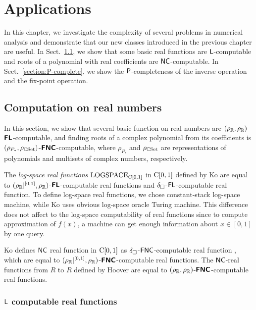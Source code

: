 \documentclass[envcountsame,orivec,oribibl]{llncs}
\begin{document}
\section{Applications}
\label{chapter:applications}
In this chapter, we investigate the complexity of several problems in numerical
analysis and demonstrate that our new classes introduced in the previous
chapter are useful.
In Sect.~\ref{section:function}, 
we show that some basic real functions are $\mathsf{L}$-computable and
roots of a polynomial with real coefficients are $\mathsf{NC}$-computable.
In Sect.~\ref{section:P-complete}, we show the $\mathsf{P}$-completeness of 
the inverse operation and the fix-point operation.

\subsection{Computation on real numbers}
\label{section:function}

In this section, we show that several basic function on real numbers are
 $(\rho _\mathbb R, \rho _\mathbb R)$-$\text{\bfseries \sffamily \upshape FL}$-computable,
and finding roots of a complex polynomial from its coefficients is 
$(\rho_{P_*}, \rho_{\mathbb C\mathrm{Set}})$-$\text{\bfseries \sffamily \upshape FNC}$-computable,
where $\rho_{P_*}$ and $\rho_{\mathbb C\mathrm{Set}}$ are representations of 
polynomials and multisets of complex numbers, respectively.

The {\em log-space real functions} $\mathrm{LOGSPACE}_{\mathrm C[0,1]}$ in 
$\mathrm C[0,1]$ defined by Ko \cite{ko1991complexity} 
are equal to $(\rho _\mathbb R|^{[0,1]}, \rho _\mathbb R)$-$\text{\bfseries \sffamily \upshape FL}$-computable real functions
and $\delta _\square$-$\mathsf{FL}$-computable real function.
To define log-space real functions, 
we chose constant-stack log-space machine,
while Ko uses obvious log-space oracle Turing machine.
This difference does not affect to the log-space computability of real functions
since to compute approximation of $f(x)$,
a machine can get enough information about $x \in [0,1]$ by one query.

Ko defines $\mathsf{NC}$ real function in $\mathrm C[0,1]$
as $\delta _\square$-$\mathsf{FNC}$-computable real function \cite{ko1991complexity},
which are equal to $(\rho _\mathbb R|^{[0,1]}, \rho _\mathbb R)$-$\text{\bfseries \sffamily \upshape FNC}$-computable real functions.
The $\mathsf{NC}$-real functions from $R$ to $R$ defined by Hoover \cite{hoover1991real}
are equal to $(\rho _\mathbb R, \rho _\mathbb R)$-$\text{\bfseries \sffamily \upshape FNC}$-computable real functions.



\subsubsection{$\mathsf{L}$ computable real functions}
\end{document}
